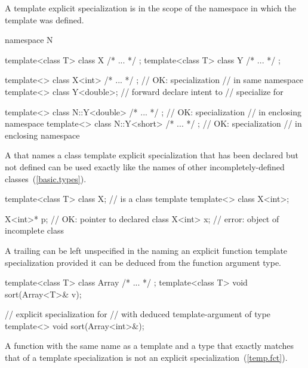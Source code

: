 \pnum
A template explicit specialization is in the scope of the namespace in which
the template was defined.
\enterexample

\begin{codeblock}
namespace N {
  template<class T> class X { /* ... */ };
  template<class T> class Y { /* ... */ };

  template<> class X<int> { /* ... */ };          // OK: specialization
                                                // in same namespace
  template<> class Y<double>;                   // forward declare intent to
                                                // specialize for 
}

template<> class N::Y<double> { /* ... */ };      // OK: specialization
                                                // in enclosing namespace
template<> class N::Y<short> { /* ... */ };       // OK: specialization
                                                // in enclosing namespace
\end{codeblock}
\exitexample

\pnum
A
that names a class template explicit specialization that has been declared but
not defined can be used exactly like the names of other incompletely-defined
classes~(\ref{basic.types}).
\enterexample

\begin{codeblock}
template<class T> class X;      //  is a class template
template<> class X<int>;

X<int>* p;                      // OK: pointer to declared class 
X<int> x;                       // error: object of incomplete class 
\end{codeblock}
\exitexample

\pnum
A trailing
can be left unspecified in the
naming an explicit function template specialization
provided it can be deduced from the function argument type.
\enterexample

\begin{codeblock}
template<class T> class Array { /* ... */ };
template<class T> void sort(Array<T>& v);

// explicit specialization for 
// with deduced template-argument of type 
template<> void sort(Array<int>&);
\end{codeblock}
\exitexample

\pnum
A function with the same name as a template and a type that exactly matches that
of a template specialization is not an explicit specialization~(\ref{temp.fct}).

